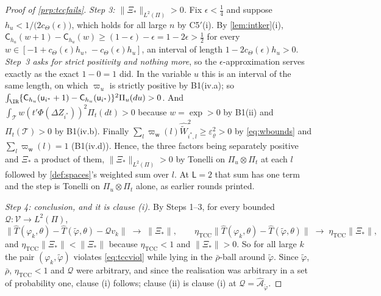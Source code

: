 \begin{proof}[Proof of \cref{prp:tccfails}]
\emph{Step 3: $\|\Xi_\ast\|_{L^{2}(\Pi)}>0$.} Fix $\epsilon<\tfrac14$ and suppose
$h_u<1/\big(2c_\Theta(\epsilon)\big)$, which holds for all large $n$ by
C5$'$(i). By \cref{lem:intker}(i), $\mathsf C_{h_u}(w+1)-\mathsf C_{h_u}(w)\ge(1-\epsilon)-\epsilon=1-2\epsilon>\tfrac12$
for every $w\in[-1+c_\Theta(\epsilon)h_u,\,-c_\Theta(\epsilon)h_u]$, an interval of length
$1-2c_\Theta(\epsilon)h_u>0$. \emph{Step~3 asks for strict positivity and nothing more}, so the
$\epsilon$-approximation serves exactly as the exact $1-0=1$ did.
In the variable $u$ this is an
interval of the same length, on which $\varpi_u$ is strictly positive by B1(iv.a); so
$\int_{\IR}\{\mathsf C_{h_u}(\mathsf u_{i^\ast}+1)-\mathsf C_{h_u}(\mathsf u_{i^\ast})\}^{2}\Pi_u(du)>0$. And
$\int_{\mathcal T}w(t'\Phi(\Delta Z_{i^\ast}))^{2}\Pi_t(dt)>0$ because $w=\exp>0$ by B1(ii) and
$\Pi_t(\mathcal T)>0$ by B1(iv.b). Finally
$\sum_l\varpi_{\mathsf w}(l)\widehat{\widetilde W}_{i^\ast,l}^{2}\ge\varepsilon_\varrho^{2}>0$ by
\eqref{eq:wbounds} and $\sum_l\varpi_{\mathsf w}(l)=1$ (B1(iv.d)). Hence, the three factors being
separately positive and $\Xi_\ast$ a product of them,
$\|\Xi_\ast\|_{L^{2}(\Pi)}>0$ by Tonelli on $\Pi_u\otimes\Pi_t$ at each $l$ followed by
\cref{def:spaces}'s weighted sum over $l$. At $\mathsf L=2$ that sum has one term and the step is
Tonelli on $\Pi_u\otimes\Pi_t$ alone, as earlier rounds printed.

\emph{Step 4: conclusion, and it is clause (i).} By Steps 1--3, for every bounded
$\mathcal Q:\mathcal V\to L^{2}(\Pi)$,
\[
\big\|\hat T(\varphi_k,\theta)-\hat T(\tilde\varphi,\theta)-\mathcal Qv_k\big\|
\;\longrightarrow\;\|\Xi_\ast\|,
\qquad
\eta_{\mathrm{TCC}}\big\|\hat T(\varphi_k,\theta)-\hat T(\tilde\varphi,\theta)\big\|
\;\longrightarrow\;\eta_{\mathrm{TCC}}\|\Xi_\ast\| ,
\]
and $\eta_{\mathrm{TCC}}\|\Xi_\ast\|<\|\Xi_\ast\|$ because $\eta_{\mathrm{TCC}}<1$ and
$\|\Xi_\ast\|>0$. So for all large $k$ the pair $(\varphi_k,\tilde\varphi)$ violates
\eqref{eq:tccviol} while lying in the $\bar\rho$-ball around $\tilde\varphi$. Since $\tilde\varphi$,
$\bar\rho$, $\eta_{\mathrm{TCC}}<1$ and $\mathcal Q$ were arbitrary, and since the realisation was
arbitrary in a set of probability one, clause (i) follows; clause (ii) is clause (i) at
$\mathcal Q=\hat{\mathcal A}_{\tilde\varphi}$.


\end{proof}
